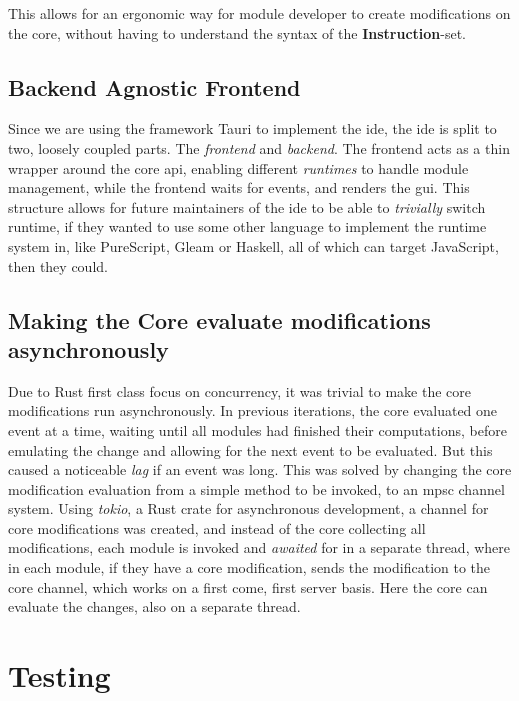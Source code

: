 This allows for an ergonomic way for module developer to create modifications on
the core, without having to understand the syntax of the
\textbf{Instruction}-set.

\subsection{Backend Agnostic Frontend}

Since we are using the framework Tauri to implement the \gls{ide}, the \gls{ide}
is split to two, loosely coupled parts. The \textit{frontend} and
\textit{backend}. The frontend acts as a thin wrapper around the core \gls{api},
enabling different \textit{runtimes} to handle module management, while the
frontend waits for events, and renders the \gls{gui}. This structure allows for
future maintainers of the \gls{ide} to be able to \textit{trivially} switch
runtime, if they wanted to use some other language to implement the runtime
system in, like PureScript, Gleam or Haskell, all of which can target
JavaScript, then they could.

\subsection{Making the Core evaluate modifications asynchronously}

Due to Rust first class focus on concurrency, it was trivial to make the core
modifications run asynchronously. In previous iterations, the core evaluated
one event at a time, waiting until all modules had finished their computations,
before emulating the change and allowing for the next event to be evaluated. But
this caused a noticeable \textit{lag} if an event was long. This was solved by
changing the core modification evaluation from a simple method to be invoked, to
an \gls{mpsc} channel system. Using \textit{tokio}, a Rust crate for
asynchronous development, a channel for core modifications was created, and
instead of the core collecting all modifications, each module is invoked and
\textit{awaited} for in a separate thread, where in each module, if they have a
core modification, sends the modification to the core channel, which works on
a first come, first server basis. Here the core can evaluate the changes, also
on a separate thread.

\section{Testing} \label{sec:testing}

